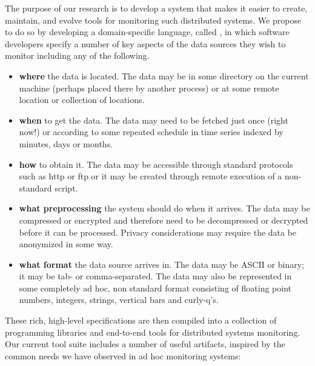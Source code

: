 \documentclass[nocopyrightspace]{sigplanconf}
\begin{document}
The purpose of our research is to develop a system that makes it easier to create,
maintain, and evolve tools for monitoring such distributed systems.  We propose to
do so by developing a domain-specific language, called \padsd, in which software developers specify
a number of key aspects of the data sources they wish to monitor including any of the
following.

\begin{itemize}
\item {\bf where} the data is located.  The data may be in some directory
on the current machine (perhaps placed there by another process) or at some remote location
or collection of locations.
\item {\bf when} to get the data.  The data may need to be fetched just once (right now!) or
according to some repeated schedule in time series indexed by minutes, days or months.
\item {\bf how} to obtain it.  The data may be accessible through standard protocols such as
http or ftp or it may be created through remote execution of a non-standard script. 
\item {\bf what preprocessing} the system should do when it arrives.  The data may be compressed
or encrypted and therefore need to be decompressed or decrypted before it can be processed.  Privacy 
considerations may require the data be anonymized in some way.
\item {\bf what format} the data source arrives in.  The data may be ASCII or binary; it may
be tab- or comma-separated.  The data may also be represented in some completely ad hoc, non standard 
format consisting of floating point numbers, integers, strings, vertical bars and curly-q's.  
\end{itemize}

These rich, high-level specifications are then compiled into a collection of programming libraries and
end-to-end tools for distributed systems monitoring.  Our current tool suite includes a number of useful
artifacts, inspired by the common needs we have observed in ad hoc monitoring systems:
\end{document}
